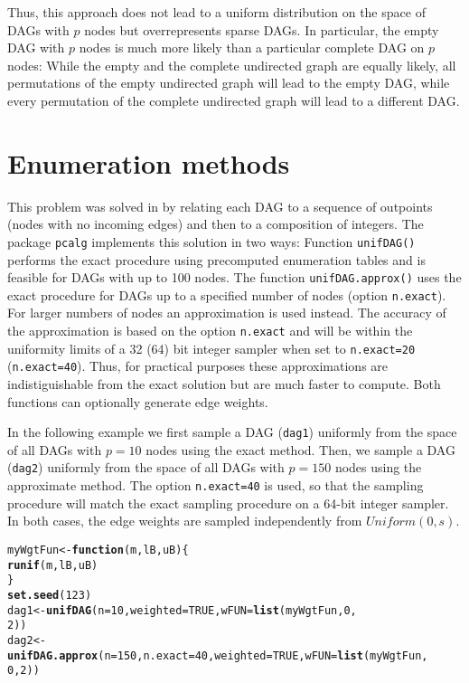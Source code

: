 \documentclass[11pt]{article}\usepackage[]{graphicx}\usepackage[]{color}
\makeatletter
\newcommand{\hlnum}[1]{\textcolor[rgb]{0.686,0.059,0.569}{#1}}%
\newcommand{\hlstd}[1]{\textcolor[rgb]{0.345,0.345,0.345}{#1}}%
\newcommand{\hlkwa}[1]{\textcolor[rgb]{0.161,0.373,0.58}{\textbf{#1}}}%
\newcommand{\hlkwb}[1]{\textcolor[rgb]{0.69,0.353,0.396}{#1}}%
\newcommand{\hlkwc}[1]{\textcolor[rgb]{0.333,0.667,0.333}{#1}}%
\newcommand{\hlkwd}[1]{\textcolor[rgb]{0.737,0.353,0.396}{\textbf{#1}}}%
\newenvironment{kframe}{%
 \def\at@end@of@kframe{}%
 \ifinner\ifhmode%
  \def\at@end@of@kframe{\end{minipage}}%
  \begin{minipage}{\columnwidth}%
 \fi\fi%
 \def\FrameCommand##1{\hskip\@totalleftmargin \hskip-\fboxsep
 \colorbox{shadecolor}{##1}\hskip-\fboxsep
     \hskip-\linewidth \hskip-\@totalleftmargin \hskip\columnwidth}%
 \MakeFramed {\advance\hsize-\width
   \@totalleftmargin\z@ \linewidth\hsize
   \@setminipage}}%
 {\par\unskip\endMakeFramed%
 \at@end@of@kframe}
\newenvironment{knitrout}{}{} %
\makeatother
\begin{document}
Thus, this approach does not lead to a uniform distribution on the space of DAGs with $p$ nodes but
overrepresents sparse DAGs. In particular, the empty DAG with $p$ nodes is
much more likely than a particular complete DAG on $p$ nodes: While the empty and the complete undirected graph are equally likely, all permutations of the empty undirected graph will lead to the empty DAG, while every permutation of the complete undirected graph will lead to a different DAG.

\section{Enumeration methods}
This problem was solved in \cite{kuipers2015uniform} by relating each DAG
to a sequence of outpoints (nodes with no incoming edges) and then to a
composition of integers. The package \texttt{pcalg} implements this solution
in two ways: Function \texttt{unifDAG()} performs the exact procedure using
precomputed enumeration tables and is feasible for DAGs with up to 100
nodes. The function \texttt{unifDAG.approx()} uses the exact procedure for DAGs
up to a specified number of nodes (option \texttt{n.exact}). For larger
numbers of nodes an approximation is used instead. The accuracy of the
approximation is based on the option \texttt{n.exact} and will be within the
uniformity limits of a 32 (64) bit integer sampler when set to
\texttt{n.exact=20} (\texttt{n.exact=40}). Thus, for practical purposes these
approximations are indistiguishable from the exact solution but are much
faster to compute. Both functions can optionally generate edge weights.

In the following example we first sample a DAG (\texttt{dag1}) uniformly from
the space of all DAGs with $p=10$ nodes using the exact method. Then, we
sample a DAG (\texttt{dag2}) uniformly from the space of all DAGs with
$p=150$ nodes using the approximate method. The option \texttt{n.exact=40} is
used, so that the sampling procedure will match the exact sampling
procedure on a 64-bit integer sampler. In both cases, the edge weights are
sampled independently from $Uniform(0, s)$.

\begin{knitrout}\small
{}\color{fgcolor}\begin{kframe}
\begin{alltt}
\hlstd{myWgtFun} \hlkwb{<-} \hlkwa{function}\hlstd{(}\hlkwc{m}\hlstd{,} \hlkwc{lB}\hlstd{,} \hlkwc{uB}\hlstd{) \{}
    \hlkwd{runif}\hlstd{(m, lB, uB)}
\hlstd{\}}
\hlkwd{set.seed}\hlstd{(}\hlnum{123}\hlstd{)}
\hlstd{dag1} \hlkwb{<-} \hlkwd{unifDAG}\hlstd{(}\hlkwc{n} \hlstd{=} \hlnum{10}\hlstd{,} \hlkwc{weighted} \hlstd{=} \hlnum{TRUE}\hlstd{,} \hlkwc{wFUN} \hlstd{=} \hlkwd{list}\hlstd{(myWgtFun,} \hlnum{0}\hlstd{,}
    \hlnum{2}\hlstd{))}
\hlstd{dag2} \hlkwb{<-} \hlkwd{unifDAG.approx}\hlstd{(}\hlkwc{n} \hlstd{=} \hlnum{150}\hlstd{,} \hlkwc{n.exact} \hlstd{=} \hlnum{40}\hlstd{,} \hlkwc{weighted} \hlstd{=} \hlnum{TRUE}\hlstd{,} \hlkwc{wFUN} \hlstd{=} \hlkwd{list}\hlstd{(myWgtFun,}
    \hlnum{0}\hlstd{,} \hlnum{2}\hlstd{))}
\end{alltt}
\end{kframe}
\end{knitrout}
\end{document}
